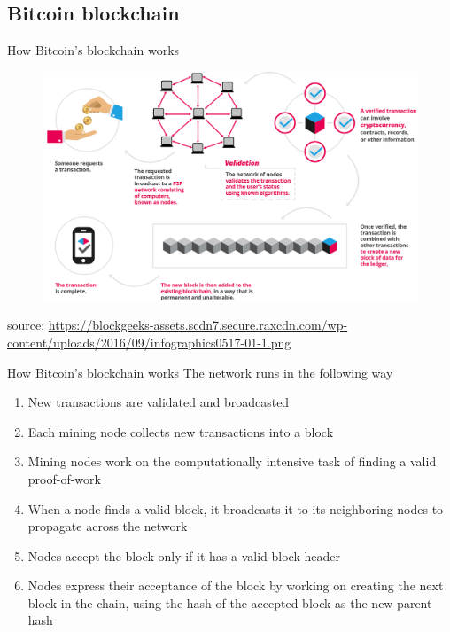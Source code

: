 \documentclass[10pt]{beamer}
\begin{document}

\subsection{Bitcoin blockchain}


\begin{frame}{How Bitcoin's blockchain works}
	\begin{figure}[]
		\centering
		\includegraphics  [scale=0.25]{Images/infographic}
	\end{figure}
	\begin{scriptsize}
		source: \href{https://blockgeeks.com/guides/what-is-blockchain-technology/}{https://blockgeeks-assets.scdn7.secure.raxcdn.com/wp-content/uploads/2016/09/infographics0517-01-1.png}
	\end{scriptsize}
\end{frame}


\begin{frame}{How Bitcoin's blockchain works}
	The network runs in the following way
	\begin{enumerate}
		\item New transactions are validated and broadcasted
		\item Each mining node collects new transactions into a block
		\item Mining nodes work on the computationally intensive task of finding a valid proof-of-work
		\item When a node finds a valid block, it broadcasts it to its neighboring nodes to propagate across the network
		\item Nodes accept the block only if it has a valid block header
		\item Nodes express their acceptance of the block by working on creating the next block in the chain, using the hash of the accepted block as the new parent hash
	\end{enumerate}
\end{frame}
\end{document}
